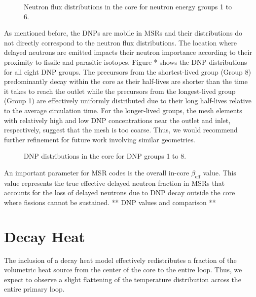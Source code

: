 \begin{figure}[htb!]
    \centering
    \caption{Neutron flux distributions in the core for neutron energy groups
    1 to 6.}
    \label{fig:neutronflux}
\end{figure}

As mentioned before, the \glspl{DNP} are mobile in \glspl{MSR} and their
distributions do not directly correspond to the neutron flux distributions.
The location where delayed neutrons are emitted impacts their neutron
importance according to their proximity to fissile and parasitic isotopes.
Figure * shows the \gls{DNP} distributions for all eight \gls{DNP} groups. The
precursors from the shortest-lived group (Group 8) predominantly decay within
the core as their half-lives are shorter than the time it takes to reach the
outlet while the precursors from the longest-lived group (Group 1) are
effectively uniformly distributed due to their long half-lives relative to the
average circulation time. For the longer-lived groups, the mesh elements with
relatively high and low \gls{DNP} concentrations near the outlet and inlet,
respectively, suggest that the mesh is too coarse. Thus, we would recommend
further refinement for future work involving similar geometries.

\begin{figure}[htb!]
    \centering
    \caption{\gls{DNP} distributions in the core for \gls{DNP} groups
    1 to 8.}
    \label{fig:dnp}
\end{figure}

An important parameter for \gls{MSR} codes is the overall in-core
$\beta_{\text{eff}}$ value. This value represents the true effective delayed
neutron fraction in \glspl{MSR} that accounts for the loss of delayed neutrons
due to \gls{DNP} decay outside the core where fissions cannot be sustained. 
** DNP values and comparison **

\section{Decay Heat}

The inclusion of a decay heat model effectively redistributes a fraction of
the volumetric heat source from the center of the core to the entire loop.
Thus, we expect to observe a slight flattening of the temperature distribution
across the entire primary loop.
